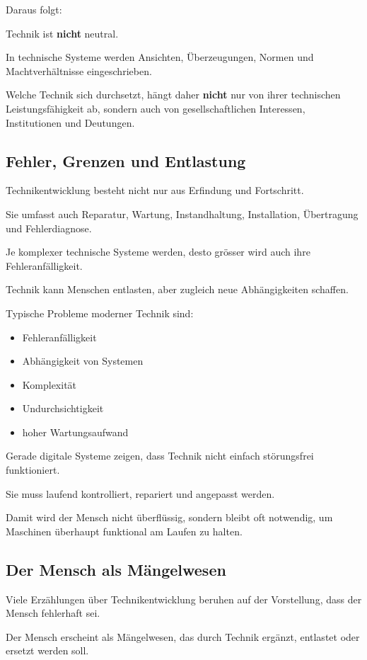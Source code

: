 Daraus folgt:

Technik ist \textbf{nicht} neutral.

In technische Systeme werden Ansichten,
Überzeugungen,
Normen und Machtverhältnisse eingeschrieben.

Welche Technik sich durchsetzt,
hängt daher \textbf{nicht} nur von ihrer technischen Leistungsfähigkeit ab,
sondern auch von gesellschaftlichen Interessen,
Institutionen und Deutungen.

\subsection{Fehler, Grenzen und Entlastung}

Technikentwicklung besteht nicht nur aus Erfindung
und Fortschritt.

Sie umfasst auch Reparatur,
Wartung,
Instandhaltung,
Installation,
Übertragung
und Fehlerdiagnose.

Je komplexer technische Systeme werden,
desto grösser wird auch ihre Fehleranfälligkeit.

Technik kann Menschen entlasten,
aber zugleich neue Abhängigkeiten schaffen.

Typische Probleme moderner Technik sind:

\begin{itemize}
\item Fehleranfälligkeit
\item Abhängigkeit von Systemen
\item Komplexität
\item Undurchsichtigkeit
\item hoher Wartungsaufwand
\end{itemize}

Gerade digitale Systeme zeigen,
dass Technik nicht einfach störungsfrei funktioniert.

Sie muss laufend kontrolliert,
repariert und angepasst werden.

Damit wird der Mensch nicht überflüssig,
sondern bleibt oft notwendig,
um Maschinen überhaupt funktional am Laufen zu halten.

\subsection{Der Mensch als Mängelwesen}

Viele Erzählungen über Technikentwicklung
beruhen auf der Vorstellung,
dass der Mensch fehlerhaft sei.

Der Mensch erscheint als Mängelwesen,
das durch Technik ergänzt,
entlastet oder ersetzt werden soll.

